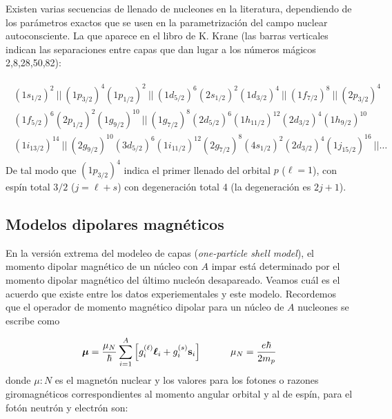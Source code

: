 Existen varias secuencias de llenado de nucleones en la literatura, dependiendo de los parámetros exactos que se usen en la parametrización del campo nuclear autoconsciente. La que aparece en el libro de K. Krane (las barras verticales indican las separaciones entre capas que dan lugar a los números mágicos 2,8,28,50,82):

\begin{eqnarray}
	\begin{array}{l}(1s_{1/2})^2 \ || \ (1p_{3/2})^4 (1p_{1/2})^2 \ || \ (1d_{5/2})^6 (2s_{1/2})^2 (1d_{3/2})^4 \ || \ (1f_{7/2})^8 \ || \ (2p_{3/2})^4 \\ (1f_{5/2})^6 (2p_{1/2})^2 (1g_{9/2})^{10} \ || \ (1g_{7/2})^8 (2d_{5/2})^6 (1h_{11/2})^{12}  (2d_{3/2})^4 (1h_{9/2})^{10} \\ (1i_{13/2})^{14} \ || \ (2g_{9/2})^{10} (3d_{5/2})^6 (1i_{11/2})^{12}  (2g_{7/2})^8 (4s_{1/2})^2 (2d_{3/2})^4  (1j_{15/2})^{16} \ ||		\ldots
	\end{array}
\end{eqnarray}
De tal modo que $(1p_{3/2})^4$ indica el primer llenado del orbital $p$ ($\ell=1$), con espín total $3/2$ ($j=\ell + s$) con degeneración total 4 (la degeneración es $2j+1$). 

\subsection{Modelos dipolares magnéticos}

En la versión extrema del modeleo de capas (\textit{one-particle shell model}), el momento dipolar magnético de un núcleo con $A$ impar está determinado por el momento dipolar magnético del último nucleón desapareado. Veamos cuál es el acuerdo que existe entre los datos experiementales y este modelo. Recordemos que el operador de momento magnético dipolar para un núcleo de $A$ nucleones se escribe como

\begin{eqnarray}
	\boldsymbol{\mu} = \frac{\mu_N}{\hbar} \sum_{i=1}^A \left[ g_i^{(\ell)} \boldsymbol{\ell}_i + g_i^{(s)}\mathbf{s}_i \right] \quad \quad \quad \mu_N = \frac{e\hbar}{2m_p}
\end{eqnarray}
donde $\mu:N$ es el magnetón nuclear y los valores para los fotones o razones giromagnéticos correspondientes al momento angular orbital y al de espín, para el fotón neutrón y electrón son:

